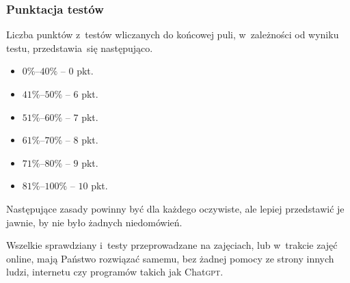 \documentclass[10pt,t]{beamer}
\begin{document}
\begin{frame}
  \frametitle{Punktacja testów}


  Liczba punktów z~testów wliczanych do końcowej puli, w~zależności od
  wyniku testu, przedstawia~się następująco.

  \vspace{-0.3em}



  \begin{itemize}

  \item $0\%\text{--}40\%$ -- $0$ pkt.

  \item $41\%\text{--}50\%$ -- $6$ pkt.

  \item $51\%\text{--}60\%$ -- $7$ pkt.

  \item $61\%\text{--}70\%$ -- $8$ pkt.

  \item $71\%\text{--}80\%$ -- $9$ pkt.

  \item $81\%\text{--}100\%$ -- $10$ pkt.

  \end{itemize}

  \vspace{-0.3em}




  Następujące zasady powinny być dla każdego oczywiste, ale lepiej
  przedstawić je jawnie, by nie było żadnych niedomówień.

  Wszelkie sprawdziany i~testy przeprowadzane na zajęciach, lub w~trakcie
  zajęć online, mają Państwo rozwiązać \alert{samemu}, bez żadnej pomocy
  ze strony innych ludzi, internetu czy programów takich jak
  Chat\textsc{gpt}.

\end{frame}





\end{document}

